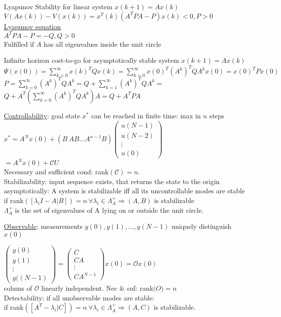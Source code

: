 \documentclass[10pt,parskip]{scrartcl}
\begin{document}
\begin{multicols*}{3}
Lyapunov Stability for linear system $x(k+1)=A x(k)$ \\
$V(Ax(k)) - V(x(k)) = x^T(k)(A^T P A -P)x(k) < 0, P>0$ \\
\underline{Lyapunov equation} \\
\hspace*{10mm}$A^T P A -P = -Q, Q > 0 $\\
Fulfilled if $A$ has all eigenvalues inside the unit circle

Infinite horizon cost-to-go for asymptotically stable system $x(k+1)=A x(k)$\\
$\Psi(x(0)) =  \sum_{k=0}^\infty x(k)^T Q x(k) = \sum_{k=0}^\infty x(0)^T (A^k)^T Q A^k x(0) = x(0)^T P x(0) $ \\
$P = \sum_{k=0}^\infty  (A^k)^T Q A^k = Q + \sum_{k=1}^\infty (A^k)^T Q A^k =$\\
$ Q + A^T (\sum_{k=0}^\infty (A^k)^T Q A^k) A =  Q+ A^T P A $

\underline{Controllability}: goal state $x^*$ can be reached in finite time: max in $n$ steps \\
$x^* = A^N x(0) + (B \ AB \dots A^{n-1}B)
\begin{pmatrix}
 u(N-1) \\
 u(N-2) \\
 \vdots \\
 u(0) 
\end{pmatrix}$\\
$= A^N x(0) + \mathcal C U$\\
Necessary and sufficient cond: rank$(\mathcal C)=n$. \\
Stabilizability: input sequence exists, that returns the state to the origin asymptotically: A system is stabilizable iff all its uncontrollable modes are stable\\
if rank$([\lambda_i I-A \vert B]) = n \ \forall \lambda_i \in \Lambda_A^+ \Rightarrow (A,B)$ is stabilizable\\
$\Lambda_A^+$ is the set of eigenvalues of A lying on or outside the unit circle.


\underline{Observable}: measurements $y(0), y(1),...,y(N-1)$ uniquely distinguish $x(0)$

$\begin{pmatrix}
y(0)\\
y(1)\\
\vdots\\
y((N-1)
\end{pmatrix}
=
\begin{pmatrix}
C\\
CA\\
\vdots\\
CA^{N-1}
\end{pmatrix}
x(0) = \mathcal O x(0)$ \\
colums of $\mathcal O$ linearly independent. Nec \& suf: rank$\mathcal(O) = n$\\
Detectability: if all unobservable modes are stable:\\
if rank$([A^T-\lambda_i \vert C]) = n \ \forall \lambda_i \in \Lambda_A^+ \Rightarrow (A,C)$ is stabilizable.



\end{multicols*}
\end{document}

